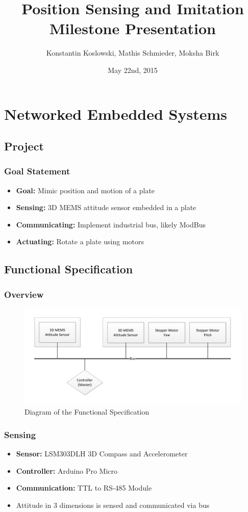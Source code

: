 \documentclass{beamer}
\title[NES Project: Milestone Presentation]{Position Sensing and Imitation\\Milestone Presentation}
\author[Koslowski, Schmieder, Birk]{Konstantin Koslowski, Mathis Schmieder, Moksha Birk}
\institute[]
{TU Berlin \\
 Department of Telecommunication Systems \\
 Telecommunication Networks Group \\
}
\date{May 22nd, 2015}
\begin{document}
\begin{frame}
  \titlepage
\end{frame}

\section{Networked Embedded Systems}
\subsection{Project}

\begin{frame}
  \frametitle{Goal Statement}
	\begin{itemize}
		\item \textbf{Goal:} Mimic position and motion of a plate
		\vfill
		\item \textbf{Sensing:} 3D MEMS attitude sensor embedded in a plate
		\item \textbf{Communicating:} Implement industrial bus, likely ModBus
		\item \textbf{Actuating:} Rotate a plate using motors
	\end{itemize}
\end{frame}

\subsection{Functional Specification}
\begin{frame}
  \frametitle{Overview}
\begin{figure}
\includegraphics[width=\textwidth]{functionalspecification.pdf} 
\caption{Diagram of the Functional Specification}
\end{figure}
\end{frame}

\begin{frame}
	\frametitle{Sensing}
	\begin{itemize}
		\item \textbf{Sensor:} LSM303DLH 3D Compass and Accelerometer
		\item \textbf{Controller:} Arduino Pro Micro
		\item \textbf{Communication:} TTL to RS-485 Module
		\item Attitude in 3 dimensions is sensed and communicated via bus
	\end{itemize}
\end{frame}
\end{document}
